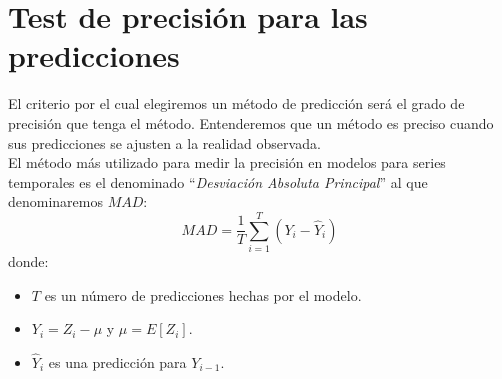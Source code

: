 %
%

\section{Test de precisi\'on para las predicciones}

El criterio por el cual elegiremos un m\'etodo de predicci\'on ser\'a el
grado de precisi\'on que tenga el m\'etodo. Entenderemos que un m\'etodo es
preciso cuando sus predicciones se ajusten a la realidad observada. \\

El m\'etodo m\'as utilizado para medir la precisi\'on en modelos para series
temporales es el denominado ``\emph{Desviaci\'on Absoluta Principal}'' al que
denominaremos $MAD$:
\begin{displaymath}
MAD = \frac{1}{T}\sum_{i=1}^T(Y_i-\widehat{Y}_i)
\end{displaymath}
donde:
\begin{itemize}
\item $T$ es un n\'umero de predicciones hechas por el modelo.
\item $Y_i=Z_i-\mu$ y $\mu = E[Z_i]$.
\item $\widehat{Y}_i$ es una predicci\'on para $Y_{i-1}$.
\end{itemize}
